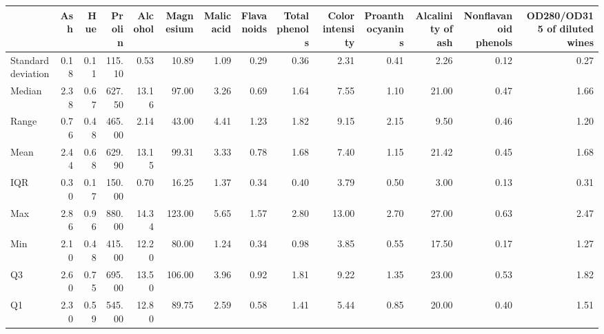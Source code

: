 \begin{tabular}{lrrrrrrrrrrrrr}
\toprule
 & Ash & Hue & Prolin & Alcohol & Magnesium & Malic acid & Flavanoids & Total phenols & Color intensity & Proanthocyanins & Alcalinity of ash & Nonflavanoid phenols & OD280/OD315 of diluted wines \\
\midrule
Standard deviation & 0.18 & 0.11 & 115.10 & 0.53 & 10.89 & 1.09 & 0.29 & 0.36 & 2.31 & 0.41 & 2.26 & 0.12 & 0.27 \\
Median & 2.38 & 0.67 & 627.50 & 13.16 & 97.00 & 3.26 & 0.69 & 1.64 & 7.55 & 1.10 & 21.00 & 0.47 & 1.66 \\
Range & 0.76 & 0.48 & 465.00 & 2.14 & 43.00 & 4.41 & 1.23 & 1.82 & 9.15 & 2.15 & 9.50 & 0.46 & 1.20 \\
Mean & 2.44 & 0.68 & 629.90 & 13.15 & 99.31 & 3.33 & 0.78 & 1.68 & 7.40 & 1.15 & 21.42 & 0.45 & 1.68 \\
IQR & 0.30 & 0.17 & 150.00 & 0.70 & 16.25 & 1.37 & 0.34 & 0.40 & 3.79 & 0.50 & 3.00 & 0.13 & 0.31 \\
Max & 2.86 & 0.96 & 880.00 & 14.34 & 123.00 & 5.65 & 1.57 & 2.80 & 13.00 & 2.70 & 27.00 & 0.63 & 2.47 \\
Min & 2.10 & 0.48 & 415.00 & 12.20 & 80.00 & 1.24 & 0.34 & 0.98 & 3.85 & 0.55 & 17.50 & 0.17 & 1.27 \\
Q3 & 2.60 & 0.75 & 695.00 & 13.50 & 106.00 & 3.96 & 0.92 & 1.81 & 9.22 & 1.35 & 23.00 & 0.53 & 1.82 \\
Q1 & 2.30 & 0.59 & 545.00 & 12.80 & 89.75 & 2.59 & 0.58 & 1.41 & 5.44 & 0.85 & 20.00 & 0.40 & 1.51 \\
\bottomrule
\end{tabular}
